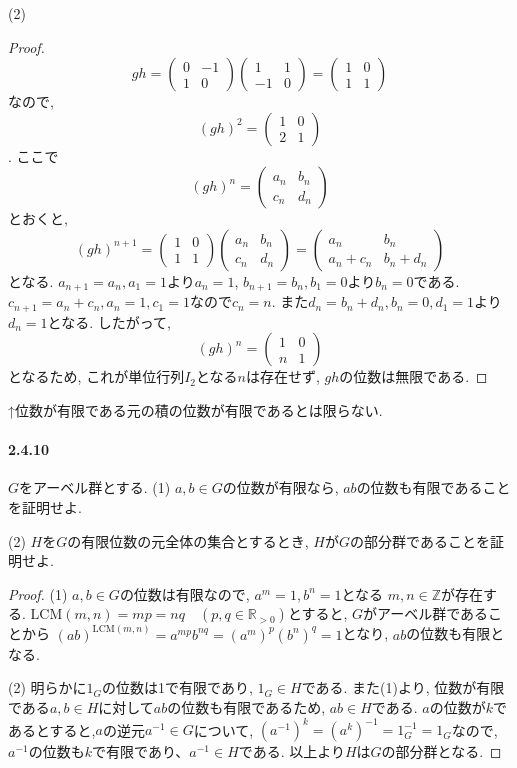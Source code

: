 (2)
\begin{proof}
	\[
	gh=\begin{pmatrix}0&-1\\1&0 \end{pmatrix}\begin{pmatrix}1&1\\-1&0 \end{pmatrix}
	=\begin{pmatrix}1&0\\1&1 \end{pmatrix}
	\]
	なので,
	\[(gh)^2=\begin{pmatrix}1&0\\2&1 \end{pmatrix}\].
	ここで
	\[(gh)^n=\begin{pmatrix}a_n&b_n\\c_n&d_n \end{pmatrix}\]
	とおくと,
	\[
	(gh)^{n+1}=\begin{pmatrix}1&0\\1&1 \end{pmatrix}
	\begin{pmatrix}a_n&b_n\\c_n&d_n \end{pmatrix}
	=\begin{pmatrix}a_n&b_n\\a_n+c_n&b_n+d_n \end{pmatrix}
	\]
	となる.
	$a_{n+1}=a_n, a_1=1$より$a_n=1$, $b_{n+1}=b_n, b_1=0$より$b_n=0$である.
	$c_{n+1}=a_n + c_n,a_n=1,c_1=1$なので$c_ n=n$. 
	また$d_n=b_n+d_n,b_n=0,d_1=1$より$d_n=1$となる.
	したがって,
	\[
	(gh)^n=\begin{pmatrix}1&0\\n&1 \end{pmatrix}
	\]
	となるため, これが単位行列$I_2$となる$n$は存在せず, $gh$の位数は無限である.
\end{proof}
↑位数が有限である元の積の位数が有限であるとは限らない.\newline

\paragraph{2.4.10} $G$をアーベル群とする.
(1) $a,b \in G$の位数が有限なら, $ab$の位数も有限であることを証明せよ.

(2) $H$を$G$の有限位数の元全体の集合とするとき,
$H$が$G$の部分群であることを証明せよ.

\begin{proof}
	(1) $a,b \in G$の位数は有限なので, $a^m=1,b^n=1$となる
	$m,n \in \mathbb{Z}$が存在する.
	$\mathrm{LCM}(m,n)=mp=nq \quad (p,q \in \mathbb{R}_{>0})$とすると,
	$G$がアーベル群であることから
	$(ab)^{\mathrm{LCM}(m,n)}=a^{mp}b^{nq}=(a^m)^p(b^n)^q=1$となり,
	$ab$の位数も有限となる.

	(2) 明らかに$1_G$の位数は1で有限であり, $1_G \in H$である.
	また(1)より, 位数が有限である$a,b \in H$に対して$ab$の位数も有限であるため,
	$ab \in H$である. $a$の位数が$k$であるとすると,$a$の逆元$a^{-1}\in G$について,
	$(a^{-1})^k=(a^k)^{-1}=1_G^{-1}=1_G$なので,
	$a^{-1}$の位数も$k$で有限であり、$a^{-1}\in H$である.
	以上より$H$は$G$の部分群となる.
\end{proof}

